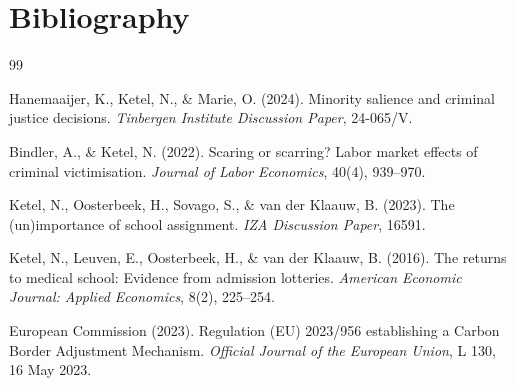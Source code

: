 \documentclass[11pt,a4paper]{article}
\begin{document}
\section{Bibliography}

\begin{thebibliography}{99}

Hanemaaijer, K., Ketel, N., \& Marie, O. (2024).
\newblock Minority salience and criminal justice decisions.
\newblock \textit{Tinbergen Institute Discussion Paper}, 24-065/V.

Bindler, A., \& Ketel, N. (2022).
\newblock Scaring or scarring? Labor market effects of criminal victimisation.
\newblock \textit{Journal of Labor Economics}, 40(4), 939--970.

Ketel, N., Oosterbeek, H., Sovago, S., \& van der Klaauw, B. (2023).
\newblock The (un)importance of school assignment.
\newblock \textit{IZA Discussion Paper}, 16591.

Ketel, N., Leuven, E., Oosterbeek, H., \& van der Klaauw, B. (2016).
\newblock The returns to medical school: Evidence from admission lotteries.
\newblock \textit{American Economic Journal: Applied Economics}, 8(2), 225--254.

European Commission (2023).
\newblock Regulation (EU) 2023/956 establishing a Carbon Border Adjustment Mechanism.
\newblock \textit{Official Journal of the European Union}, L 130, 16 May 2023.

\end{thebibliography}
\end{document}
